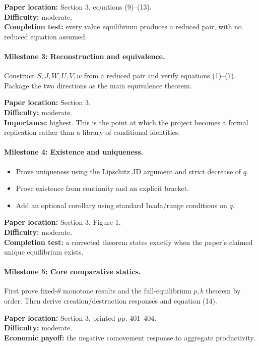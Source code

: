 \documentclass[11pt]{article}
\begin{document}
\textbf{Paper location:} Section 3, equations (9)--(13). \\
\textbf{Difficulty:} moderate. \\
\textbf{Completion test:} every value equilibrium produces a reduced pair, with no reduced equation assumed.

\paragraph{Milestone 3: Reconstruction and equivalence.}
Construct $S,J,W,U,V,w$ from a reduced pair and verify equations (1)--(7). Package the two directions as the main equivalence theorem.

\textbf{Paper location:} Section 3. \\
\textbf{Difficulty:} moderate. \\
\textbf{Importance:} highest. This is the point at which the project becomes a formal replication rather than a library of conditional identities.

\paragraph{Milestone 4: Existence and uniqueness.}
\begin{itemize}
\item Prove uniqueness using the Lipschitz JD argument and strict decrease of $q$.
\item Prove existence from continuity and an explicit bracket.
\item Add an optional corollary using standard Inada/range conditions on $q$.
\end{itemize}

\textbf{Paper location:} Section 3, Figure 1. \\
\textbf{Difficulty:} moderate. \\
\textbf{Completion test:} a corrected theorem states exactly when the paper's claimed unique equilibrium exists.

\paragraph{Milestone 5: Core comparative statics.}
First prove fixed-$\theta$ monotone results and the full-equilibrium $p,b$ theorem by order. Then derive creation/destruction responses and equation (14).

\textbf{Paper location:} Section 3, printed pp. 401--404. \\
\textbf{Difficulty:} moderate. \\
\textbf{Economic payoff:} the negative comovement response to aggregate productivity.
\end{document}
